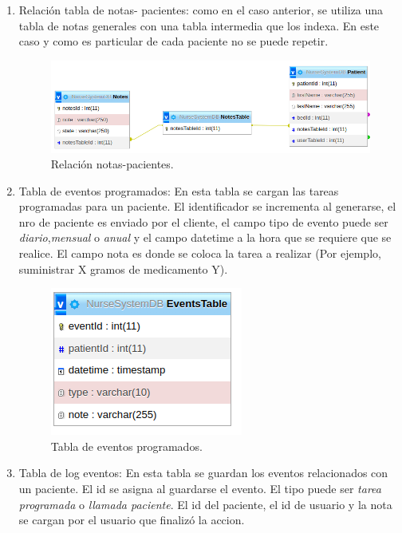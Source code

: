\begin{enumerate}
\item Relación tabla de notas- pacientes: como en el caso anterior, se utiliza una tabla de notas generales con una tabla intermedia que los indexa. En este caso y como es particular de cada paciente no se puede repetir.


\begin{figure}[ht]
	\centering
	\includegraphics[scale=.45]{./Figures/patient-notes.png}
	\caption{Relación notas-pacientes.}
	\label{fig:Relación notas-pacientes (base de datos)}
\end{figure}

\pagebreak

\item Tabla de eventos programados: En esta tabla se cargan las tareas programadas para un paciente. El identificador se incrementa al generarse, el nro de paciente es enviado por el cliente, el campo tipo de evento puede ser \textit{diario},\textit{mensual} o \textit{anual} y el campo datetime a la hora que se requiere que se realice. El campo nota es donde se coloca la tarea a realizar (Por ejemplo, suministrar X gramos de medicamento Y).


\begin{figure}[ht]
	\centering
	\includegraphics[scale=.45]{./Figures/Events.png}
	\caption{Tabla de eventos programados.}
	\label{fig:Tabla de eventos programados (base de datos)}
\end{figure}


\item Tabla de log eventos: En esta tabla se guardan los eventos relacionados con un paciente. El id se asigna al guardarse el evento. El tipo puede ser \textit{tarea programada} o \textit{llamada paciente}. El id del paciente, el id de usuario y la nota se cargan por el usuario que finalizó la accion.



\end{enumerate}

